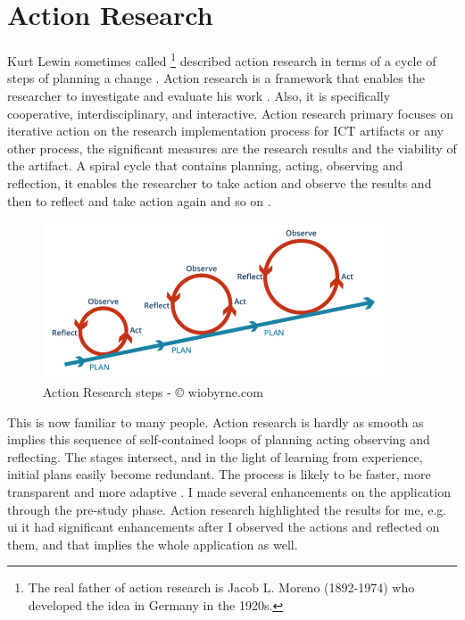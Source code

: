 \section{Action Research}

Kurt Lewin sometimes called \footnote{The real father of action research is Jacob L. Moreno (1892-1974) who developed the idea in Germany in the 1920s.} described action research in terms of a cycle of steps of planning a change \citep{KemmisSdanMcTaggart1988}.
Action research is a framework that enables the researcher to investigate and evaluate his work \citep{Khanna2007AllResearch}. Also, it is specifically cooperative, interdisciplinary, and interactive. Action research primary focuses on iterative action on the research implementation process for ICT artifacts or any other process, the significant measures are the research results and the viability of the artifact. A spiral cycle that contains planning, acting, observing and reflection, it enables the researcher to take action and observe the results and then to reflect and take action again and so on \citep{Hayes2011TheInteraction}. 
\begin{figure}[ht]
    \centering
    \includegraphics[width=0.90\textwidth]{images/par.png}
    \caption{Action Research steps - © wiobyrne.com  }
    \label{fig:par}
\end{figure}

This  is now familiar to many people. Action research is hardly as smooth as implies this sequence of self-contained loops of planning acting observing and reflecting. The stages intersect, and in the light of learning from experience, initial plans easily become redundant. The process is likely to be faster, more transparent and more adaptive \citep{KemmisSdanMcTaggart1988}. I made several enhancements on the application through the pre-study phase. Action research highlighted the results for me, e.g. \acrfull{ui} it had significant enhancements after I observed the actions and reflected on them, and that implies the whole application as well.     


